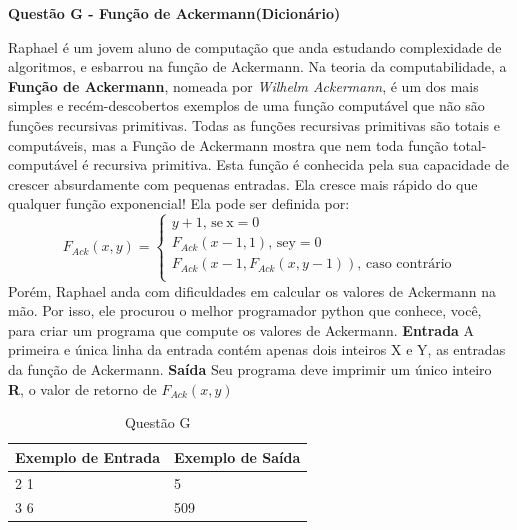 \documentclass[a4paper, 12pt]{article}
\begin{document}
\newpage %
\begin{center}
\textbf{{\Large Questão G - Função de Ackermann(Dicionário)}}
\end{center}
\vspace{5pt}
Raphael é um jovem aluno de computação que anda estudando
complexidade de algoritmos, e esbarrou na função de Ackermann. Na teoria da computabilidade, a \textbf{Função de Ackermann}, nomeada por \textit{Wilhelm Ackermann}, é um dos mais simples e recém-descobertos exemplos de uma função computável que não são funções recursivas primitivas. Todas as funções recursivas primitivas são totais e computáveis, mas a Função de Ackermann mostra que nem toda função total-computável é recursiva primitiva. \newline \newline
Esta função é conhecida pela sua capacidade de crescer absurdamente com
pequenas entradas. Ela cresce mais rápido do que qualquer função exponencial! Ela pode ser definida por:
$$F_{Ack}(x,y) =
		\begin{cases}
			y + 1,\, \textrm{se}\ \textrm{x} = 0 \\
			F_{Ack}(x-1,1),\, \textrm{se} \textrm{y} = 0 \\
			F_{Ack}(x-1,F_{Ack}(x,y-1)),\, \textrm{caso contrário} \\
		\end{cases}
$$
Porém, Raphael anda com dificuldades em calcular os valores de Ackermann
na mão. Por isso, ele procurou o melhor programador python que conhece, você,
para criar um programa que compute os valores de Ackermann.
\newline \newline
\textbf{{\large Entrada}} \newline
A primeira e única linha da entrada contém apenas dois inteiros X e Y, as entradas
da função de Ackermann.
\newline \newline
\textbf{{\large Saída}} \newline
Seu programa deve imprimir um único inteiro \textbf{R}, o valor de retorno de $F_{Ack}(x,y)$
\newline
\begin{table}[H]
\centering
\begin{tabular}{|l|l|}
\hline
\textbf{Exemplo de Entrada} & \textbf{Exemplo de Saída} \\ \hline
2 1                         & 5                         \\ \hline
3 6                         & 509                       \\ \hline
\end{tabular}
\caption{Questão G}
\label{tabela6}
\end{table}
\end{document}
